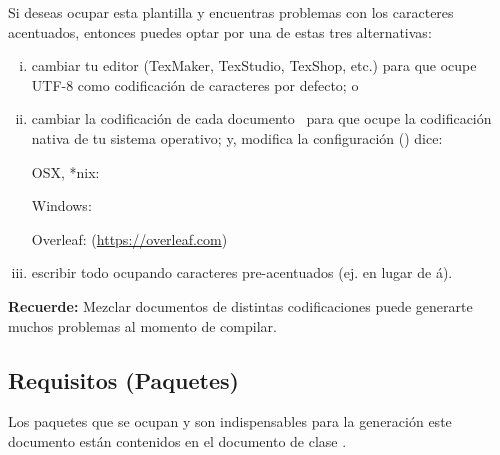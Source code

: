 Si deseas ocupar esta plantilla y encuentras problemas con los caracteres acentuados, entonces puedes optar por una de estas tres alternativas:
\begin{enumerate}[(i)]
    \item cambiar tu editor (TexMaker, TexStudio, TexShop, etc.) para que ocupe UTF-8 como codificación de caracteres por defecto; o
    \item cambiar la codificación de cada documento  para que ocupe la codificación nativa de tu sistema operativo; y, modifica la configuración () dice:
    
    OSX, *nix: 

    Windows: 

    Overleaf:  (\url{https://overleaf.com})

    \item escribir todo ocupando caracteres pre-acentuados (ej.  en lugar de á).
\end{enumerate}

\vspace{10mm}
\begin{framed}
    \textbf{Recuerde:} Mezclar documentos de distintas codificaciones puede generarte muchos problemas al momento de compilar.  
\end{framed}

\subsection{Requisitos (Paquetes)}
Los paquetes que se ocupan y son indispensables para la generación este documento están contenidos en el documento de clase .


